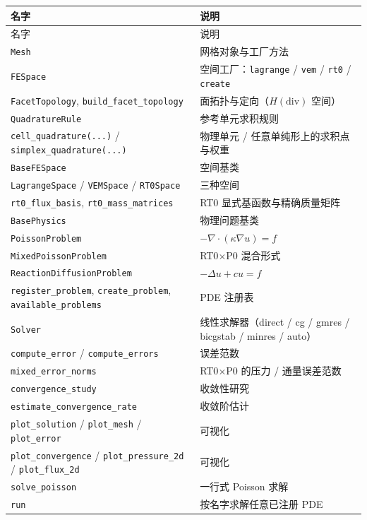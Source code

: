 \documentclass[UTF8,11pt,oneside]{ctexbook}
\theoremstyle{definition}
\theoremstyle{plain}
\newcommand{\code}[1]{\texttt{#1}}
\begin{document}
\begingroup\footnotesize
\begin{longtable}{@{}L{5.0cm}L{9.4cm}@{}}
\toprule
名字 & 说明 \\
\midrule
\endfirsthead
\toprule
名字 & 说明 \\
\midrule
\endhead
\code{Mesh} & 网格对象与工厂方法 \\
\code{FESpace} & 空间工厂：\code{lagrange} / \code{vem} / \code{rt0} / \code{create} \\
\code{FacetTopology}, \code{build\_\allowbreak facet\_\allowbreak topology} & 面拓扑与定向（$H(\mathrm{div})$ 空间） \\
\code{QuadratureRule} & 参考单元求积规则 \\
\code{cell\_\allowbreak quadrature(...)} / \code{simplex\_\allowbreak quadrature(...)} & 物理单元 / 任意单纯形上的求积点与权重 \\
\code{BaseFESpace} & 空间基类 \\
\code{LagrangeSpace} / \code{VEMSpace} / \code{RT0Space} & 三种空间 \\
\code{rt0\_\allowbreak flux\_\allowbreak basis}, \code{rt0\_\allowbreak mass\_\allowbreak matrices} & RT0 显式基函数与精确质量矩阵 \\
\code{BasePhysics} & 物理问题基类 \\
\code{PoissonProblem} & $-\nabla\cdot(\kappa\nabla u)=f$ \\
\code{MixedPoissonProblem} & RT0$\times$P0 混合形式 \\
\code{ReactionDiffusionProblem} & $-\Delta u+cu=f$ \\
\code{register\_\allowbreak problem}, \code{create\_\allowbreak problem}, \code{available\_\allowbreak problems} & PDE 注册表 \\
\code{Solver} & 线性求解器（direct / cg / gmres / bicgstab / minres / auto） \\
\code{compute\_\allowbreak error} / \code{compute\_\allowbreak errors} & 误差范数 \\
\code{mixed\_\allowbreak error\_\allowbreak norms} & RT0$\times$P0 的压力 / 通量误差范数 \\
\code{convergence\_\allowbreak study} & 收敛性研究 \\
\code{estimate\_\allowbreak convergence\_\allowbreak rate} & 收敛阶估计 \\
\code{plot\_\allowbreak solution} / \code{plot\_\allowbreak mesh} / \code{plot\_\allowbreak error} & 可视化 \\
\code{plot\_\allowbreak convergence} / \code{plot\_\allowbreak pressure\_\allowbreak 2d} / \code{plot\_\allowbreak flux\_\allowbreak 2d} & 可视化 \\
\code{solve\_\allowbreak poisson} & 一行式 Poisson 求解 \\
\code{run} & 按名字求解任意已注册 PDE \\
\bottomrule
\end{longtable}
\endgroup
\end{document}

